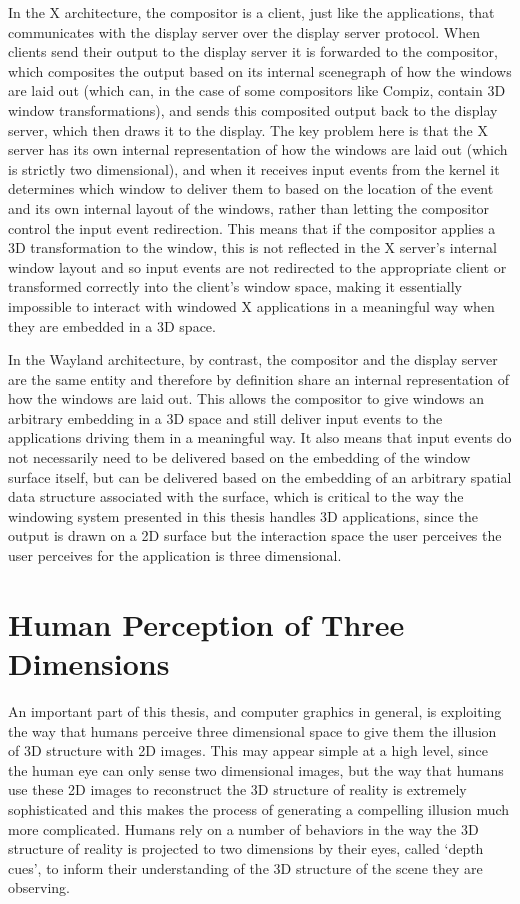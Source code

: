 In the X architecture, the compositor is a client, just like the applications, that communicates with the display server over the display server protocol. When clients send their output to the display server it is forwarded to the compositor, which composites the output based on its internal scenegraph of how the windows are laid out (which can, in the case of some compositors like Compiz, contain 3D window transformations), and sends this composited output back to the display server, which then draws it to the display. The key problem here is that the X server has its own internal representation of how the windows are laid out (which is strictly two dimensional), and when it receives input events from the kernel it  determines which window to deliver them to based on the location of the event and its own internal layout of the windows, rather than letting the compositor control the input event redirection. This means that if the compositor applies a 3D transformation to the window, this is not reflected in the X server’s internal window layout and so input events are not redirected to the appropriate client or transformed correctly into the client’s window space, making it essentially impossible to interact with windowed X applications in a meaningful way when they are embedded in a 3D space. 

In the Wayland architecture, by contrast, the compositor and the display server are the same entity and therefore by definition share an internal representation of how the windows are laid out. This allows the compositor to give windows an arbitrary embedding in a 3D space and still deliver input events to the applications driving them in a meaningful way. It also means that input events do not necessarily need to be delivered based on the embedding of the window surface itself, but can be delivered based on the embedding of an arbitrary spatial data structure associated with the surface, which is critical to the way the windowing system presented in this thesis handles 3D applications, since the output is drawn on a 2D surface but the interaction space the user perceives the user perceives for the application is three dimensional.

\section{Human Perception of Three Dimensions}

An important part of this thesis, and computer graphics in general, is exploiting the way that humans perceive three dimensional space to give them the illusion of 3D structure with 2D images. This may appear simple at a high level, since the human eye can only sense two dimensional images, but the way that humans use these 2D images to reconstruct the 3D structure of reality is extremely sophisticated and this makes the process of generating a compelling illusion much more complicated. Humans rely on a number of behaviors in the way the 3D structure of reality is projected to two dimensions by their eyes, called ‘depth cues’, to inform their understanding of the 3D structure of the scene they are observing.
	
